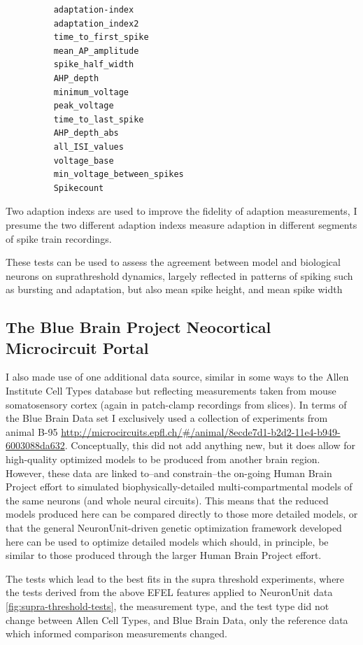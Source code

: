 \begin{figure}
\begin{verbatim}
    adaptation-index
    adaptation_index2
    time_to_first_spike
    mean_AP_amplitude
    spike_half_width
    AHP_depth
    minimum_voltage
    peak_voltage
    time_to_last_spike
    AHP_depth_abs
    all_ISI_values
    voltage_base
    min_voltage_between_spikes
    Spikecount
\end{verbatim}
\label{verbatim:supra-threshold-tests}
\end{figure}

Two adaption indexs are used to improve the fidelity of adaption measurements, I presume the two different adaption indexs measure adaption in different segments of spike train recordings.


These tests can be used to assess the agreement between model and biological neurons on suprathreshold dynamics, largely reflected in patterns of spiking such as bursting and adaptation, but also mean spike height, and mean spike width

\subsection{The Blue Brain Project Neocortical Microcircuit Portal}
I also made use of one additional data source, similar in some ways to the Allen Institute Cell Types database but reflecting measurements taken from mouse somatosensory cortex (again in patch-clamp recordings from slices). In terms of the Blue Brain Data set I exclusively used a collection of experiments from animal B-95 \url{http://microcircuits.epfl.ch/#/animal/8ecde7d1-b2d2-11e4-b949-6003088da632}.
Conceptually, this did not add anything new, but it does allow for high-quality optimized models to be produced from another brain region.
However, these data are linked to--and constrain--the on-going Human Brain Project effort to simulated biophysically-detailed multi-compartmental models of the same neurons (and whole neural circuits).
This means that the reduced models produced here can be compared directly to those more detailed models, or that the general NeuronUnit-driven genetic optimization framework developed here can be used to optimize detailed models which should, in principle, be similar to those produced through the larger Human Brain Project effort.

The tests which lead to the best fits in the supra threshold experiments, where the tests derived from the above EFEL features applied to NeuronUnit data \ref{fig:supra-threshold-tests}, the measurement type, and the test type did not change between Allen Cell Types, and Blue Brain Data, only the reference data which informed comparison measurements changed.

